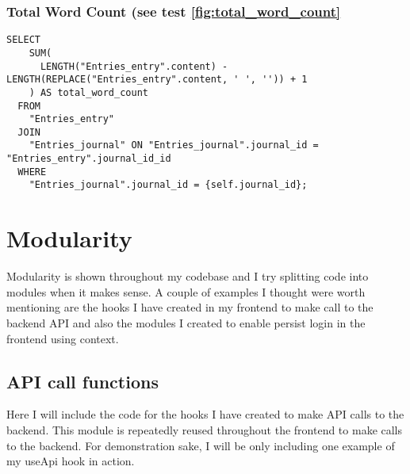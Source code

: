 \subsubsection{Total Word Count (see test \ref{fig:total_word_count}}
\begin{verbatim}
SELECT
    SUM(
      LENGTH("Entries_entry".content) - LENGTH(REPLACE("Entries_entry".content, ' ', '')) + 1
    ) AS total_word_count
  FROM
    "Entries_entry"
  JOIN
    "Entries_journal" ON "Entries_journal".journal_id = "Entries_entry".journal_id_id
  WHERE
    "Entries_journal".journal_id = {self.journal_id};
\end{verbatim}

\section{Modularity}
Modularity is shown throughout my codebase and I try splitting code into modules when it makes sense. A couple of examples I thought were worth mentioning are the hooks I have created in my frontend to make call to the backend API and also the modules I created to enable persist login in the frontend using context. 

\subsection{API call functions}
Here I will include the code for the hooks I have created to make API calls to the backend. This module is repeatedly reused throughout the frontend to make calls to the backend. For demonstration sake, I will be only including one example of my useApi hook in action.

